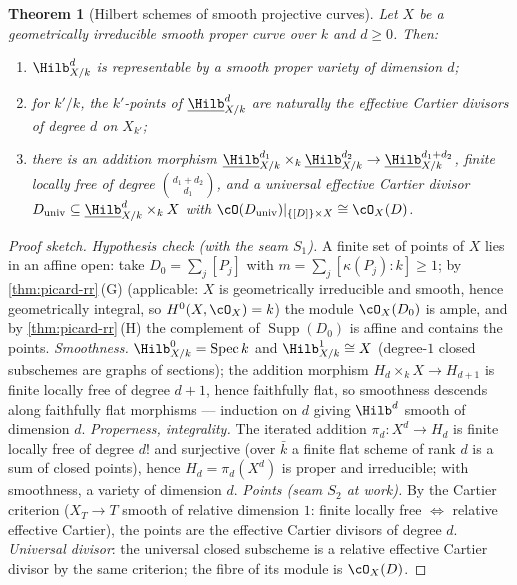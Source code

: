 \documentclass[11pt]{article}
\theoremstyle{plain}
\newtheorem{theorem}{Theorem}[section]
\theoremstyle{definition}
\DeclareMathOperator{\Spec}{Spec}
\newcommand{\Cref}[1]{\hyperref[#1]{\ref{#1}}\,\hyperref[#1]{\nameref*{#1}}}
\begin{document}
\begin{theorem}[Hilbert schemes of smooth projective curves]
\label{thm:picard-hilb-curves}
Let $X$ be a geometrically irreducible smooth proper curve over $k$
and $d\ge0$.  Then:
\begin{enumerate}
\item[(1)] $\Hilb^d_{X/k}$ is representable by a smooth proper
\emph{variety} of dimension $d$;
\item[(2)] for $k'/k$, the $k'$-points of $\underline{\Hilb}^d_{X/k}$
are naturally the effective Cartier divisors of degree $d$ on
$X_{k'}$;
\item[(3)] there is an addition morphism
$\underline{\Hilb}^{d_1}_{X/k}\times_k\underline{\Hilb}^{d_2}_{X/k}
\to\underline{\Hilb}^{d_1+d_2}_{X/k}$, finite locally free of degree
$\binom{d_1+d_2}{d_1}$, and a universal effective Cartier divisor
$D_{\mathrm{univ}}\subseteq\underline{\Hilb}^d_{X/k}\times_kX$ with
$\cO(D_{\mathrm{univ}})|_{\{[D]\}\times X}\cong\cO_X(D)$.
\end{enumerate}
\end{theorem}

\begin{proof}[Proof sketch]
\emph{Hypothesis check (with the seam $S_1$).}  A finite set of
points of $X$ lies in an affine open: take $D_0=\sum_j[P_j]$ with
$m=\sum_j[\kappa(P_j):k]\ge1$; by \Cref{thm:picard-rr}(G) (applicable:
$X$ is geometrically irreducible and smooth, hence geometrically
integral, so $H^0(X,\cO_X)=k$) the module
$\cO_X(D_0)$ is ample, and by \Cref{thm:picard-rr}(H) the complement of
$\operatorname{Supp}(D_0)$ is affine and contains the points.
\emph{Smoothness.}  $\Hilb^0_{X/k}=\Spec k$ and
$\Hilb^1_{X/k}\cong X$ (degree-$1$ closed subschemes are graphs of
sections); the addition morphism $H_d\times_kX\to H_{d+1}$ is finite
locally free of degree $d+1$, hence faithfully flat, so smoothness
descends along faithfully flat morphisms --- induction on $d$ giving
$\Hilb^d$ smooth of dimension $d$.
\emph{Properness, integrality.}  The iterated addition
$\pi_d:X^d\to H_d$ is finite locally free of degree $d!$ and
surjective (over $\bar k$ a finite flat scheme of rank $d$ is a sum
of closed points), hence $H_d=\pi_d(X^d)$ is proper and irreducible;
with smoothness, a variety of dimension $d$.
\emph{Points (seam $S_2$ at work).}  By the Cartier criterion
($X_T\to T$ smooth of relative dimension $1$: finite locally free
$\iff$ relative effective Cartier), the points are the effective
Cartier divisors of degree $d$.  \emph{Universal divisor}: the
universal closed subscheme is a relative effective Cartier divisor
by the same criterion; the fibre of its module is $\cO_X(D)$.
\end{proof}
\end{document}
